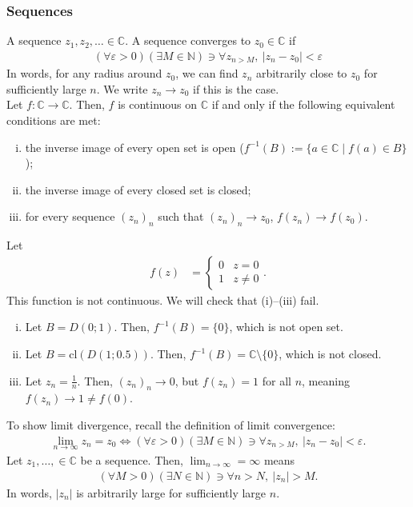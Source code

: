 \documentclass[10pt]{extarticle}
\newcommand{\N}{\mathbb{N}}
\newcommand{\C}{\mathbb{C}}
\begin{document}
  \subsubsection{Sequences}%
  A sequence $z_1,z_2,\dots \in \C$. A sequence converges to $z_0\in\C$ if 
  \begin{align*}
    (\forall \varepsilon > 0)(\exists M\in \N) \ni \forall z_{n > M},~|z_n-z_0| < \varepsilon
  \end{align*}
  In words, for any radius around $z_0$, we can find $z_n$ arbitrarily close to $z_0$ for sufficiently large $n$. We write $z_n\rightarrow z_0$ if this is the case.\\

  Let $f: \C\rightarrow\C$. Then, $f$ is continuous on $\C$ if and only if the following equivalent conditions are met:
  \begin{enumerate}[(i)]
    \item the inverse image of every open set is open ($f^{-1}(B):=\{a\in \C\mid f(a)\in B\}$);
    \item the inverse image of every closed set is closed;
    \item for every sequence $(z_n)_n$ such that $(z_n)_n\rightarrow z_0$, $f(z_n)\rightarrow f(z_0)$.
  \end{enumerate}
  Let
  \begin{align*}
    f(z) &= \begin{cases}
      0&z=0\\
      1 & z\neq 0
    \end{cases}.
  \end{align*}
  This function is not continuous. We will check that (i)--(iii) fail.
  \begin{enumerate}[(i)]
    \item Let $B = D(0;1)$. Then, $f^{-1}(B) = \{0\}$, which is not open set.
    \item Let $B = \text{cl}(D(1;0.5))$. Then, $f^{-1}(B) = \C\setminus\{0\}$, which is not closed.
    \item Let $z_n = \frac{1}{n}$. Then, $(z_n)_n\rightarrow 0$, but $f(z_n) = 1$ for all $n$, meaning $f(z_n)\rightarrow 1\neq f(0)$.
  \end{enumerate}
  To show limit divergence, recall the definition of limit convergence:
  \begin{align*}
    \lim_{n\rightarrow\infty} z_n = z_0 \Leftrightarrow (\forall \varepsilon > 0)(\exists M\in \N) \ni \forall z_{n > M},~|z_n-z_{0}| < \varepsilon.
  \end{align*}
  Let $z_1,\dots,\in \C$ be a sequence. Then, $\lim_{n\rightarrow\infty} = \infty$ means
  \begin{align*}
    (\forall M > 0)(\exists N\in \N) \ni \forall n > N,~|z_n| > M.
  \end{align*}
  In words, $|z_n|$ is arbitrarily large for sufficiently large $n$.
\end{document}
